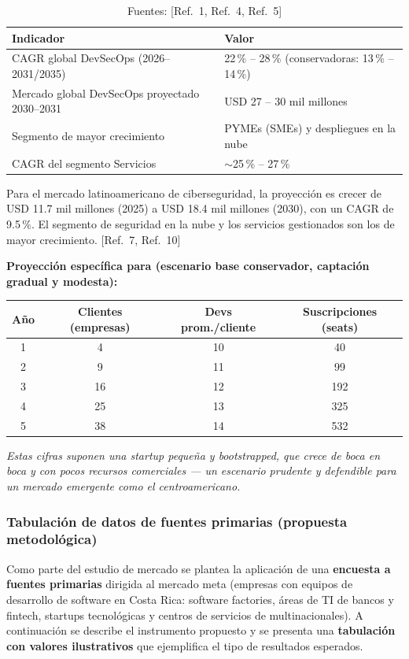 \begin{table}[ht]
  \centering
  \begin{tabularx}{\linewidth}{Yl}
    \toprule
    \textbf{Indicador} & \textbf{Valor} \\
    \midrule
    CAGR global DevSecOps (2026--2031/2035) & 22\,\% -- 28\,\% (conservadoras: 13\,\% -- 14\,\%) \\
    Mercado global DevSecOps proyectado 2030--2031 & USD 27 -- 30 mil millones \\
    Segmento de mayor crecimiento & PYMEs (SMEs) y despliegues en la nube \\
    CAGR del segmento Servicios & $\sim$25\,\% -- 27\,\% \\
    \bottomrule
  \end{tabularx}
  \caption{Fuentes: [Ref.~1, Ref.~4, Ref.~5]}
\end{table}

Para el mercado latinoamericano de ciberseguridad, la proyección es crecer de
USD 11.7 mil millones (2025) a USD 18.4 mil millones (2030), con un CAGR de 9.5\,\%.
El segmento de seguridad en la nube y los servicios gestionados son los de mayor
crecimiento. [Ref.~7, Ref.~10]

\noindent\textbf{Proyección específica para \NombreProducto{} (escenario base
conservador, captación gradual y modesta):}

\begin{table}[ht]
  \centering
  \begin{tabular}{cccc}
    \toprule
    \textbf{Año} & \textbf{Clientes (empresas)} & \textbf{Devs prom./cliente} & \textbf{Suscripciones (seats)} \\
    \midrule
    1 & 4  & 10 & 40  \\
    2 & 9  & 11 & 99  \\
    3 & 16 & 12 & 192 \\
    4 & 25 & 13 & 325 \\
    5 & 38 & 14 & 532 \\
    \bottomrule
  \end{tabular}
\end{table}

\emph{Estas cifras suponen una startup pequeña y bootstrapped, que crece de boca en
boca y con pocos recursos comerciales — un escenario prudente y defendible para un
mercado emergente como el centroamericano.}

\subsubsection{Tabulación de datos de fuentes primarias (propuesta metodológica)}
Como parte del estudio de mercado se plantea la aplicación de una \textbf{encuesta a
fuentes primarias} dirigida al mercado meta (empresas con equipos de desarrollo de
software en Costa Rica: software factories, áreas de TI de bancos y fintech, startups
tecnológicas y centros de servicios de multinacionales). A continuación se describe el
instrumento propuesto y se presenta una \textbf{tabulación con valores ilustrativos}
que ejemplifica el tipo de resultados esperados.

